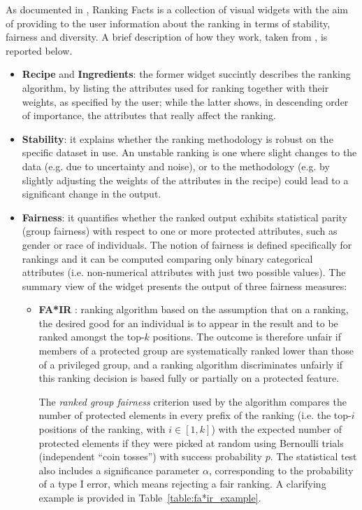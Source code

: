 As documented in \cite{yang2018nutritional}, Ranking Facts is a collection of visual widgets with the aim of providing to the user information about the ranking in terms of stability, fairness and diversity. A brief description of how they work, taken from \cite{yang2018nutritional}, is reported below.
\begin{itemize}
\item \textbf{Recipe} and \textbf{Ingredients}: the former widget succintly describes the ranking algorithm, by listing the attributes used for ranking together with their weights, as specified by the user; while the latter shows, in descending order of importance, the attributes that really affect the ranking.
\item \textbf{Stability}: it explains whether the ranking methodology is robust on the specific dataset in use. An unstable ranking is one where slight changes to the data (e.g. due to uncertainty and noise), or to the methodology (e.g. by slightly adjusting the weights of the attributes in the recipe) could lead to a significant change in the output.
\item \textbf{Fairness}: it quantifies whether the ranked output exhibits statistical parity (group fairness) with respect to one or more protected attributes, such as gender or race of individuals. The notion of fairness is defined specifically for rankings and it can be computed comparing only binary categorical attributes (i.e. non-numerical attributes with just two possible values). The summary view of the widget presents the output of three fairness measures:

\begin{itemize}
\item \textbf{FA*IR} \cite{zehlike2017fa*ir}: ranking algorithm based on the assumption that on a ranking, the desired good for an individual is to appear in the result and to be ranked amongst the top-\(k\) positions. The outcome is therefore unfair if members of a protected group are systematically ranked lower than those of a privileged group, and a ranking algorithm discriminates unfairly if this ranking decision is based fully or partially on a protected feature.

The \textit{ranked group fairness} criterion used by the algorithm compares the number of protected elements in every prefix of the ranking (i.e. the top-\(i\) positions of the ranking, with \(i \in [1, k]\)) with the expected number of protected elements if they were picked at random using Bernoulli trials (independent ``coin tosses'') with success probability \(p\). The statistical test also includes a significance parameter \(\alpha\), corresponding to the probability of a type I error, which means rejecting a fair ranking. A clarifying example is provided in Table~\ref{table:fa*ir_example}.


\end{itemize}
\end{itemize}
